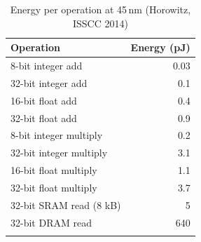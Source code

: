 \begin{table}[htbp]
\caption{Energy per operation at 45\,nm (Horowitz, ISSCC 2014)}\label{tab:energyref}
\begin{tabular}{@{}lr@{}}
\toprule
Operation & Energy (pJ) \\
\midrule
8-bit integer add & 0.03 \\
32-bit integer add & 0.1 \\
16-bit float add & 0.4 \\
32-bit float add & 0.9 \\
8-bit integer multiply & 0.2 \\
32-bit integer multiply & 3.1 \\
16-bit float multiply & 1.1 \\
32-bit float multiply & 3.7 \\
32-bit SRAM read (8 kB) & 5 \\
32-bit DRAM read & 640 \\
\botrule
\end{tabular}
\end{table}
